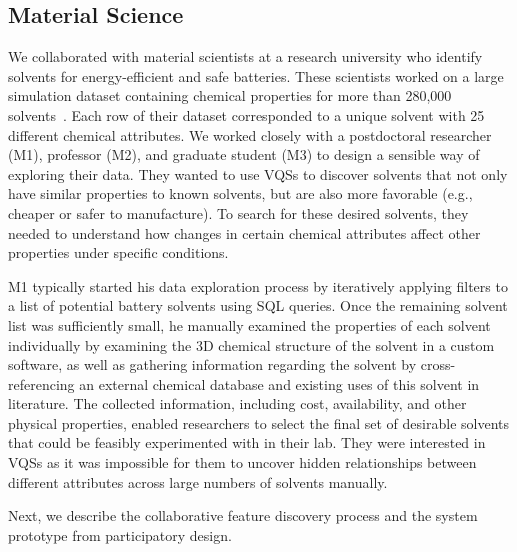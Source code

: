 \subsection{Material Science}
 \par\noindent{} 
 \npar We collaborated with material scientists at a research university who identify solvents for energy-efficient and safe batteries. These scientists worked on a large simulation dataset containing chemical properties for more than 280,000 solvents~\cite{Khetan2018}. Each row of their dataset corresponded to a unique solvent with 25 different chemical attributes. We worked closely with a postdoctoral researcher (M1), professor (M2), and graduate student (M3) to design a sensible way of exploring their data. They wanted to use VQSs to discover solvents that not only have similar properties to known solvents, but are also more favorable (e.g., cheaper or safer to manufacture). To search for these desired solvents, they needed to understand how changes in certain chemical attributes affect other properties under specific conditions.
 \par\noindent{} 
 \npar M1 typically started his data exploration process by iteratively applying filters to a list of potential battery solvents using SQL queries. Once the remaining solvent list was sufficiently small, he manually examined the properties of each solvent individually by examining the 3D chemical structure of the solvent in a custom software, as well as gathering information regarding the solvent by cross-referencing an external chemical database and existing uses of this solvent in literature. The collected information, including cost, availability, and other physical properties, enabled researchers to select the final set of desirable solvents that could be feasibly experimented with in their lab. They were interested in VQSs as it was impossible for them to uncover hidden relationships between different attributes across large numbers of solvents manually.%
 \par Next, we describe the collaborative feature discovery process and the system prototype from participatory design.
 